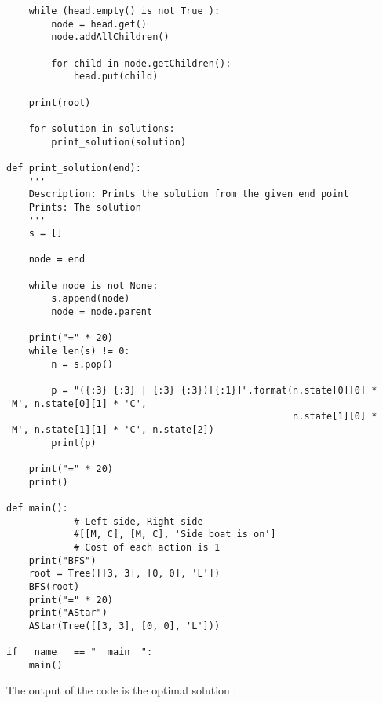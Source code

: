 \documentclass{article}
\begin{document}
\newpage
\begin{verbatim}
    while (head.empty() is not True ): 
        node = head.get()
        node.addAllChildren()
        
        for child in node.getChildren():
            head.put(child)

    print(root)
    
    for solution in solutions:
        print_solution(solution)
    
def print_solution(end):
    '''
    Description: Prints the solution from the given end point
    Prints: The solution
    '''
    s = []
    
    node = end

    while node is not None:
        s.append(node)
        node = node.parent

    print("=" * 20)
    while len(s) != 0:
        n = s.pop()

        p = "({:3} {:3} | {:3} {:3})[{:1}]".format(n.state[0][0] * 'M', n.state[0][1] * 'C', 
                                                   n.state[1][0] * 'M', n.state[1][1] * 'C', n.state[2])
        print(p)

    print("=" * 20)
    print()

def main():
            # Left side, Right side
            #[[M, C], [M, C], 'Side boat is on']
            # Cost of each action is 1
    print("BFS")
    root = Tree([[3, 3], [0, 0], 'L'])
    BFS(root)
    print("=" * 20)
    print("AStar")
    AStar(Tree([[3, 3], [0, 0], 'L']))

if __name__ == "__main__":
    main()
\end{verbatim}
The output of the code is the optimal solution : 
\end{document}
